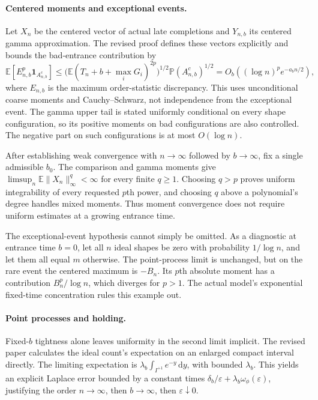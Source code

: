 \documentclass[11pt]{article}
\newcommand{\Pbb}{\mathbb P}
\newcommand{\Ebb}{\mathbb E}
\begin{document}
\paragraph{Centered moments and exceptional events.}
Let $X_n$ be the centered vector of actual late completions and $Y_{n,b}$
its centered gamma approximation. The revised proof defines these vectors
explicitly and bounds the bad-entrance contribution by
\[
 \Ebb[E_{n,b}^p\mathbf1_{A_{n,b}^c}]
 \le\bigl(\Ebb(T_n+b+\max_iG_i)^{2p}\bigr)^{1/2}
      \Pbb(A_{n,b}^c)^{1/2}
 =O_b((\log n)^p e^{-a_bn/2}),
\]
where $E_{n,b}$ is the maximum order-statistic discrepancy. This uses
unconditional coarse moments and Cauchy--Schwarz, not independence from the
exceptional event. The gamma upper tail is stated uniformly conditional on
every shape configuration, so its positive moments on bad configurations
are also controlled. The negative part on such configurations is at most
$O(\log n)$.

After establishing weak convergence with $n\to\infty$ followed by
$b\to\infty$, fix a single admissible $b_0$. The comparison and gamma moments
give $\limsup_n\Ebb\lVert X_n\rVert_\infty^q<\infty$ for every finite
$q\ge1$. Choosing $q>p$ proves uniform integrability of every requested
$p$th power, and choosing $q$ above a polynomial's degree handles mixed
moments. Thus moment convergence does not require uniform estimates at a
growing entrance time.

The exceptional-event hypothesis cannot simply be omitted. As a diagnostic
at entrance time $b=0$, let all $n$ ideal shapes be zero with probability
$1/\log n$, and let them
all equal $m$ otherwise. The point-process limit is unchanged, but on the
rare event the centered maximum is $-B_n$. Its $p$th absolute moment has a
contribution $B_n^p/\log n$, which diverges for $p>1$. The actual model's
exponential fixed-time concentration rules this example out.

\paragraph{Point processes and holding.}
Fixed-$b$ tightness alone leaves uniformity in the second limit implicit.
The revised paper calculates the ideal count's expectation on an enlarged
compact interval directly. The limiting expectation is
$\lambda_b\int_{I^{+1}}e^{-y}\,\mathrm dy$, with bounded $\lambda_b$.
This yields an explicit Laplace error bounded by a constant times
$\delta_b/\varepsilon+\lambda_b\omega_\phi(\varepsilon)$, justifying the
order $n\to\infty$, then $b\to\infty$, then $\varepsilon\downarrow0$.
\end{document}
